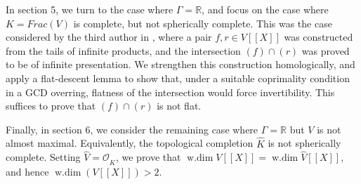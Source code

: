 \documentclass[12pt]{amsart}
\theoremstyle{plain}
\newcommand{\wdim}{\operatorname{w.dim}}
\begin{document}
In section 5, we turn to the case where $\Gamma=\mathbb{R}$, and focus on the case where $K=Frac(V)$ is complete, but not spherically complete. This was the case considered by the third author in \cite[Section 4]{Wang}, where a pair $f,r\in V[[X]]$ was constructed from the tails of infinite products, and the intersection $(f)\cap (r)$ was proved to be of infinite presentation. We strengthen this construction homologically, and apply a flat-descent lemma to show that, under a suitable coprimality condition in a GCD overring, flatness of the intersection would force invertibility. This suffices to prove that $(f)\cap (r)$ is not flat.

Finally, in section 6, we consider the remaining case where $\Gamma=\mathbb{R}$ but $V$ is not almost maximal. Equivalently, the topological completion $\widehat{K}$ is not spherically complete. Setting $\widehat{V}=\mathcal{O}_{\widehat{K}}$, we prove that $\wdim V[[X]] = \wdim\widehat{V}[[X]]$, and hence $\wdim(V[[X]])>2$.\\



\end{document}
